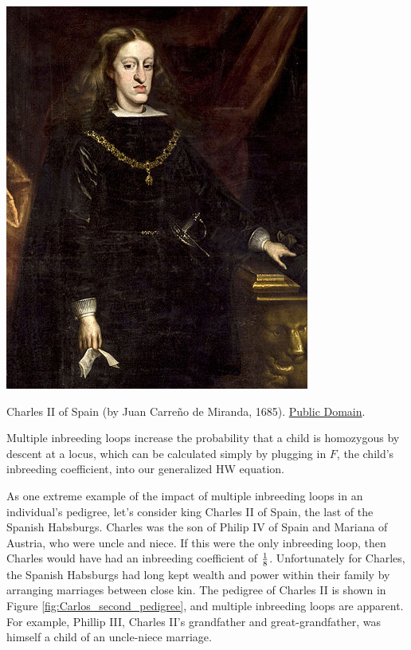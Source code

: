 \begin{marginfigure}[-4cm]
\begin{center}
  \includegraphics[width=
  \textwidth]{illustration_images/alleles_genotypes/Carlos_second/378px-Juan_de_Miranda_Carreno_002.jpg}
\end{center}
\caption{Charles II of Spain (by Juan Carre\~{n}o de Miranda,
  1685). \href{https://it.wikipedia.org/wiki/Carlo_II_di_Spagna\#/media/File:Juan_de_Miranda_Carreno_002.jpg}{Public Domain}.} \label{fig:Carlos_second}
\end{marginfigure}
Multiple inbreeding loops increase the probability that a child
is homozygous by descent at a locus, which can be calculated simply by plugging in $F$, the child's
inbreeding coefficient, into our generalized HW equation.


As one extreme example of the impact of multiple inbreeding loops in
an individual's pedigree, let's consider king Charles II of
Spain, the last of the Spanish Habsburgs.  Charles was the son of
Philip IV of Spain and Mariana of Austria, who were uncle and
niece. If this were the only inbreeding loop, then Charles would have had an
inbreeding coefficient of $\nicefrac{1}{8}$. Unfortunately for Charles, the
Spanish Habsburgs had long kept wealth and power within their family
by arranging marriages between close kin. The pedigree of Charles II is shown in Figure \ref{fig:Carlos_second_pedigree}, and
multiple inbreeding loops are apparent. For example, Phillip III,
Charles II's grandfather and great-grandfather, was himself a child of
an uncle-niece marriage.

